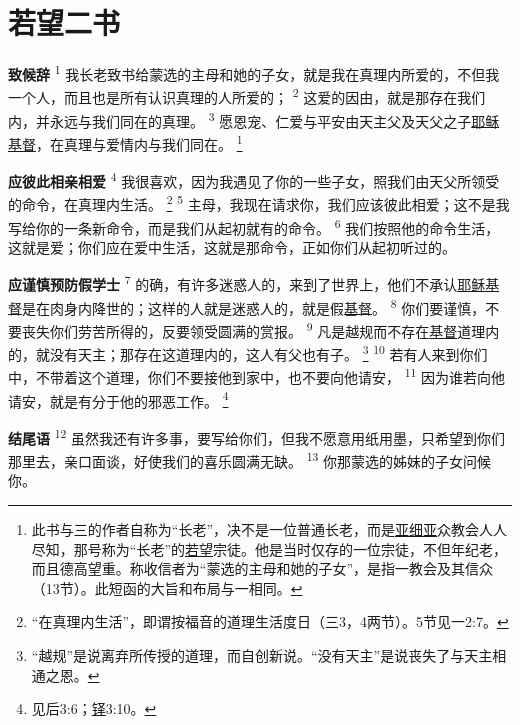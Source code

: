 \chapter*{若望二书}


\textbf{致候辞\quad}
\textsuperscript{1}
我长老致书给蒙选的主母和她的子女，就是我在真理内所爱的，不但我一个人，而且也是所有认识真理的人所爱的；
\textsuperscript{2}
这爱的因由，就是那存在我们内，并永远与我们同在的真理。
\textsuperscript{3}
愿恩宠、仁爱与平安由天主父及天父之子\uline{耶稣}\uline{基督}，在真理与爱情内与我们同在。
\renewcommand\thefootnote{\ding{\numexpr171+\value{footnote}}}
\footnote{此书与三的作者自称为“长老”，决不是一位普通长老，而是\uline{亚细亚}众教会人人尽知，那号称为“长老”的\uline{若望}宗徒。他是当时仅存的一位宗徒，不但年纪老，而且德高望重。称收信者为“蒙选的主母和她的子女”，是指一教会及其信众（13节）。此短函的大旨和布局与一相同。}

\textbf{应彼此相亲相爱\quad}
\textsuperscript{4}
我很喜欢，因为我遇见了你的一些子女，照我们由天父所领受的命令，在真理内生活。
\footnote{“在真理内生活”，即谓按福音的道理生活度日（三3，4两节）。5节见一2:7。}
\textsuperscript{5}
主母，我现在请求你，我们应该彼此相爱；这不是我写给你的一条新命令，而是我们从起初就有的命令。
\textsuperscript{6}
我们按照他的命令生活，这就是爱；你们应在爱中生活，这就是那命令，正如你们从起初听过的。

\textbf{应谨慎预防假学士\quad}
\textsuperscript{7}
的确，有许多迷惑人的，来到了世界上，他们不承认\uline{耶稣}\uline{基督}是在肉身内降世的；这样的人就是迷惑人的，就是假\uline{基督}。
\textsuperscript{8}
你们要谨慎，不要丧失你们劳苦所得的，反要领受圆满的赏报。
\textsuperscript{9}
凡是越规而不存在\uline{基督}道理内的，就没有天主；那存在这道理内的，这人有父也有子。
\footnote{“越规”是说离弃所传授的道理，而自创新说。“没有天主”是说丧失了与天主相通之恩。}
\textsuperscript{10}
若有人来到你们中，不带着这个道理，你们不要接他到家中，也不要向他请安，
\textsuperscript{11}
因为谁若向他请安，就是有分于他的邪恶工作。
\footnote{见后3:6；\uline{铎}3:10。}

\textbf{结尾语\quad}
\textsuperscript{12}
虽然我还有许多事，要写给你们，但我不愿意用纸用墨，只希望到你们那里去，亲口面谈，好使我们的喜乐圆满无缺。
\textsuperscript{13}
你那蒙选的姊妹的子女问候你。
